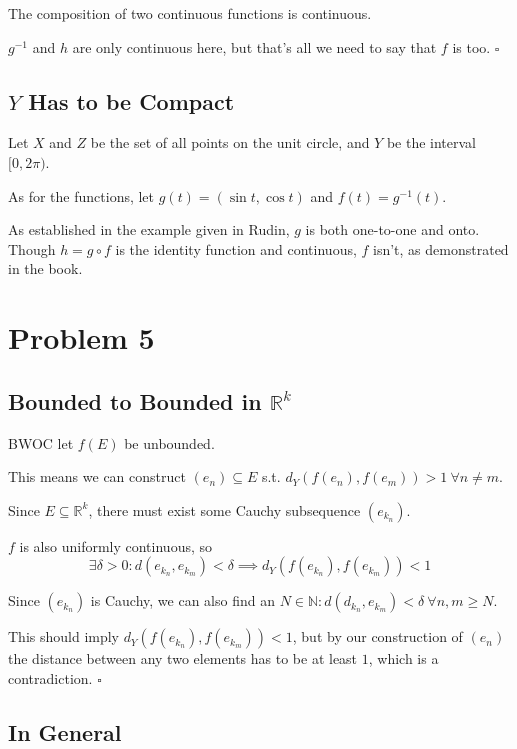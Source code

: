 \documentclass[12pt]{article}
\newcommand{\N}{\mathbb{N}}
\newcommand{\R}{\mathbb{R}}
\begin{document}
The composition of two continuous functions is continuous.

$g^{-1}$ and $h$ are only continuous here, but that's all we need to say that $f$ is too. $\square$

\subsection{\texorpdfstring{$Y$}{Y} Has to be Compact}

Let $X$ and $Z$ be the set of all points on the unit circle, and $Y$ be the interval $[0, 2\pi)$.

As for the functions, let $g(t)=(\sin t, \cos t)$ and $f(t)=g^{-1}(t)$.

As established in the example given in Rudin, $g$ is both one-to-one and onto.
Though $h=g \circ f$ is the identity function and continuous, $f$ isn't,
as demonstrated in the book.

\pagebreak

\section{Problem 5}

\subsection{Bounded to Bounded in \texorpdfstring{$\R^k$}{R\^k}}

BWOC let $f(E)$ be unbounded.

This means we can construct $(e_n) \subseteq E$ s.t. $d_Y(f(e_n), f(e_m)) > 1\ \forall n \ne m$.

Since $E \subseteq \R^k$, there must exist some Cauchy subsequence $\left(e_{k_n}\right)$.

$f$ is also uniformly continuous, so
\[\exists \delta > 0: d(e_{k_n}, e_{k_m}) < \delta \implies d_Y(f(e_{k_n}), f(e_{k_m})) < 1\]

Since $\left(e_{k_n}\right)$ is Cauchy, we can also find an
$N \in \N: d(d_{k_n}, e_{k_m}) < \delta\ \forall n, m \ge N$.

This should imply $d_Y(f(e_{k_n}), f(e_{k_m})) < 1$, but
by our construction of $(e_n)$ the distance between any two elements has
to be at least $1$, which is a contradiction. $\square$

\subsection{In General}
\end{document}

